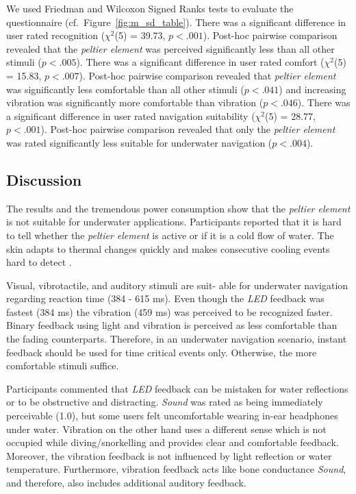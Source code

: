 We used Friedman and Wilcoxon Signed Ranks tests to evaluate the questionnaire (cf.\ Figure~\ref{fig:m_sd_table}).
There was a significant difference in user rated recognition ($\chi^2$(5) = 39.73, $p<.001$).
Post-hoc pairwise comparison revealed that the \emph{peltier element} was perceived significantly less than all other stimuli ($p<.005$). \newline
There was a significant difference in user rated comfort ($\chi^2$(5) = 15.83, $p<.007$).
Post-hoc pairwise comparison revealed that \emph{peltier element} was significantly less comfortable than all other stimuli ($p<.041$) and increasing vibration was significantly more comfortable than vibration ($p<.046$). \newline
There was a significant difference in user rated navigation suitability ($\chi^2$(5) = 28.77, $p<.001$). 
Post-hoc pairwise comparison revealed that only the \emph{peltier element} was rated significantly less suitable for underwater navigation ($p<.004$).

\subsection{Discussion}
The results and the tremendous power consumption show that the \emph{peltier element} is not suitable for underwater applications. 
Participants reported that it is hard to tell whether the \emph{peltier element} is active or if it is a cold flow of water. 
The skin adapts to thermal changes quickly and makes consecutive cooling events hard to detect \citep{Halvey_thermalFeedback}. 

Visual, vibrotactile, and auditory stimuli are suit- able for underwater navigation regarding reaction time (384 - 615 ms). 
Even though the \emph{LED} feedback was fastest (384 ms) the vibration (459 ms) was perceived to be recognized faster. 
Binary feedback using light and vibration is perceived as less comfortable than the fading counterparts. 
Therefore, in an underwater navigation scenario, instant feedback should be used for time critical events only. 
Otherwise, the more comfortable stimuli suffice. 

Participants commented that \emph{LED} feedback can be mistaken for water reflections or to be obstructive and distracting. 
\emph{Sound} was rated as being immediately perceivable (1.0), but some users felt uncomfortable wearing in-ear headphones under water. 
Vibration on the other hand uses a different sense which is not occupied while diving/snorkelling and provides clear and comfortable feedback.
Moreover, the vibration feedback is not influenced by light reflection or water temperature.
Furthermore, vibration feedback acts like bone conductance \emph{Sound}, and therefore, also includes additional auditory feedback.

